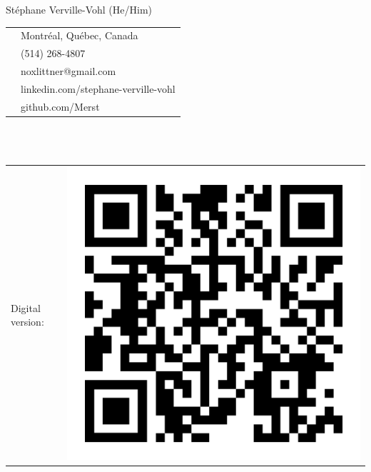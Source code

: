 \documentclass[letterpaper, 10pt]{article}
\begin{document}
\pagestyle{empty} %

{\Huge {Stéphane Verville-Vohl}} {\huge(He/Him)}\\
\begin{table}
\begin{tabular}{rl}
    \faGlobeAmericas { :} & Montréal, Québec, Canada \\
    \faPhoneSquare   { :} & (514) 268-4807 \\
    \faAt            { :} & noxlittner@gmail.com \\
    \faLinkedin      { :} & linkedin.com/stephane-verville-vohl \\
    \faGithubSquare  { :} & github.com/Merst
\end{tabular}
\end{table}
\\ \\
\begin{tabular}{m{7em} m{5em}}
     Digital version: &
     \includegraphics[scale=0.04]{qr-code} \\
\end{tabular}
\end{document}

